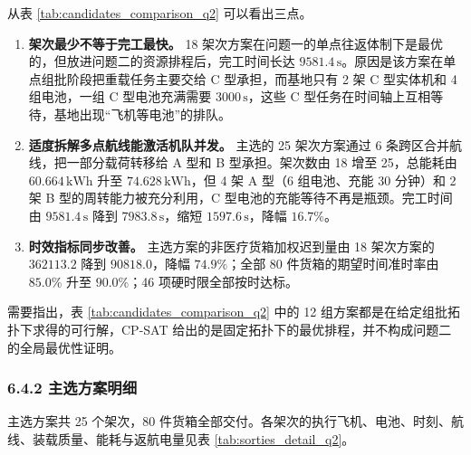 \documentclass[withoutpreface,bwprint]{format}
\begin{document}
从表 \ref{tab:candidates_comparison_q2} 可以看出三点。

\begin{enumerate}[leftmargin=*]
    \item \textbf{架次最少不等于完工最快。} 18 架次方案在问题一的单点往返体制下是最优的，但放进问题二的资源排程后，完工时间长达 $9581.4\,\text{s}$。原因是该方案在单点组批阶段把重载任务主要交给 C 型承担，而基地只有 2 架 C 型实体机和 4 组电池，一组 C 型电池充满需要 $3000\,\text{s}$，这些 C 型任务在时间轴上互相等待，基地出现“飞机等电池”的排队。

    \item \textbf{适度拆解多点航线能激活机队并发。} 主选的 25 架次方案通过 6 条跨区合并航线，把一部分载荷转移给 A 型和 B 型承担。架次数由 18 增至 25，总能耗由 $60.664\,\text{kWh}$ 升至 $74.628\,\text{kWh}$，但 4 架 A 型（6 组电池、充能 30 分钟）和 2 架 B 型的周转能力被充分利用，C 型电池的充能等待不再是瓶颈。完工时间由 $9581.4\,\text{s}$ 降到 $7983.8\,\text{s}$，缩短 $1597.6\,\text{s}$，降幅 $16.7\%$。

    \item \textbf{时效指标同步改善。} 主选方案的非医疗货箱加权迟到量由 18 架次方案的 $362113.2$ 降到 $90818.0$，降幅 $74.9\%$；全部 80 件货箱的期望时间准时率由 $85.0\%$ 升至 $90.0\%$；46 项硬时限全部按时达标。
\end{enumerate}

需要指出，表 \ref{tab:candidates_comparison_q2} 中的 12 组方案都是在给定组批拓扑下求得的可行解，CP-SAT 给出的是固定拓扑下的最优排程，并不构成问题二的全局最优性证明。

\subsubsection{6.4.2 主选方案明细}
主选方案共 25 个架次，80 件货箱全部交付。各架次的执行飞机、电池、时刻、航线、装载质量、能耗与返航电量见表 \ref{tab:sorties_detail_q2}。
\end{document}
